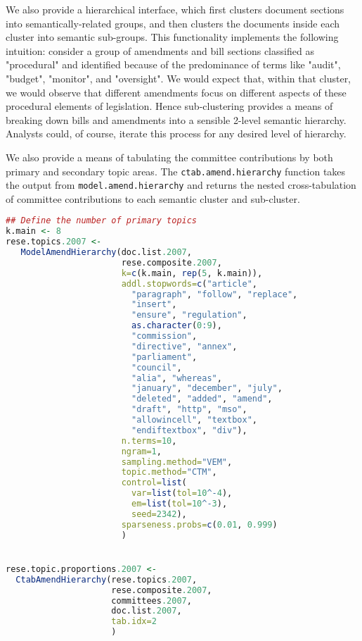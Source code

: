 \documentclass[11pt]{article}
\begin{document}
We also provide a hierarchical interface, which first clusters document
sections into semantically-related groups, and then clusters the
documents inside each cluster into semantic sub-groups. This
functionality implements the following intuition: consider a group of
amendments and bill sections classified as "procedural" and identified
because of the predominance of terms like "audit", "budget",
"monitor", and "oversight". We would expect that, within that cluster,
we would observe that different amendments focus on different aspects
of these procedural elements of legislation. Hence sub-clustering
provides a means of breaking down bills and amendments into a sensible
2-level semantic hierarchy. Analysts could, of course, iterate this
process for any desired level of hierarchy. 

We also provide a means of tabulating the committee contributions by
both primary and secondary topic areas. The
\texttt{ctab.amend.hierarchy} function takes the output from
\texttt{model.amend.hierarchy} and returns the nested cross-tabulation
of committee contributions to each semantic cluster and sub-cluster. 

\begin{lstlisting}[language=R, numbers=none]
## Define the number of primary topics
k.main <- 8
rese.topics.2007 <- 
   ModelAmendHierarchy(doc.list.2007,
                       rese.composite.2007,
                       k=c(k.main, rep(5, k.main)),
                       addl.stopwords=c("article",
                         "paragraph", "follow", "replace",
                         "insert",
                         "ensure", "regulation",
                         as.character(0:9),
                         "commission",
                         "directive", "annex",
                         "parliament",
                         "council",
                         "alia", "whereas",
                         "january", "december", "july",
                         "deleted", "added", "amend",
                         "draft", "http", "mso",
                         "allowincell", "textbox",
                         "endiftextbox", "div"),
                       n.terms=10,
                       ngram=1,
                       sampling.method="VEM",
                       topic.method="CTM",
                       control=list(
                         var=list(tol=10^-4),
                         em=list(tol=10^-3),
                         seed=2342),
                       sparseness.probs=c(0.01, 0.999)
                       )


rese.topic.proportions.2007 <-
  CtabAmendHierarchy(rese.topics.2007,
                     rese.composite.2007,
                     committees.2007,
                     doc.list.2007,
                     tab.idx=2
                     )

\end{lstlisting}
\end{document}
